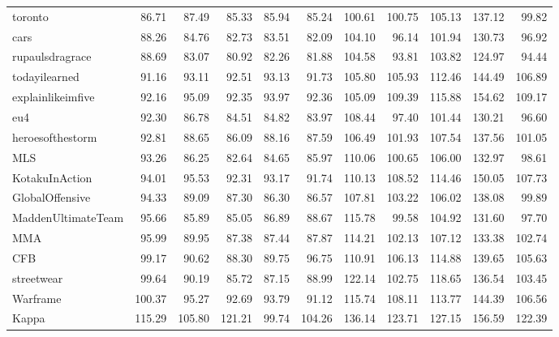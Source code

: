 \begin{tabular}{lrrrrrrrrrr}
toronto             &  86.71 &  87.49 &  85.33 & 85.94 &  85.24 &      100.61 & 100.75 & 105.13 & 137.12 &  99.82 \\
cars                &  88.26 &  84.76 &  82.73 & 83.51 &  82.09 &      104.10 &  96.14 & 101.94 & 130.73 &  96.92 \\
rupaulsdragrace     &  88.69 &  83.07 &  80.92 & 82.26 &  81.88 &      104.58 &  93.81 & 103.82 & 124.97 &  94.44 \\
todayilearned       &  91.16 &  93.11 &  92.51 & 93.13 &  91.73 &      105.80 & 105.93 & 112.46 & 144.49 & 106.89 \\
explainlikeimfive   &  92.16 &  95.09 &  92.35 & 93.97 &  92.36 &      105.09 & 109.39 & 115.88 & 154.62 & 109.17 \\
eu4                 &  92.30 &  86.78 &  84.51 & 84.82 &  83.97 &      108.44 &  97.40 & 101.44 & 130.21 &  96.60 \\
heroesofthestorm    &  92.81 &  88.65 &  86.09 & 88.16 &  87.59 &      106.49 & 101.93 & 107.54 & 137.56 & 101.05 \\
MLS                 &  93.26 &  86.25 &  82.64 & 84.65 &  85.97 &      110.06 & 100.65 & 106.00 & 132.97 &  98.61 \\
KotakuInAction      &  94.01 &  95.53 &  92.31 & 93.17 &  91.74 &      110.13 & 108.52 & 114.46 & 150.05 & 107.73 \\
GlobalOffensive     &  94.33 &  89.09 &  87.30 & 86.30 &  86.57 &      107.81 & 103.22 & 106.02 & 138.08 &  99.89 \\
MaddenUltimateTeam  &  95.66 &  85.89 &  85.05 & 86.89 &  88.67 &      115.78 &  99.58 & 104.92 & 131.60 &  97.70 \\
MMA                 &  95.99 &  89.95 &  87.38 & 87.44 &  87.87 &      114.21 & 102.13 & 107.12 & 133.38 & 102.74 \\
CFB                 &  99.17 &  90.62 &  88.30 & 89.75 &  96.75 &      110.91 & 106.13 & 114.88 & 139.65 & 105.63 \\
streetwear          &  99.64 &  90.19 &  85.72 & 87.15 &  88.99 &      122.14 & 102.75 & 118.65 & 136.54 & 103.45 \\
Warframe            & 100.37 &  95.27 &  92.69 & 93.79 &  91.12 &      115.74 & 108.11 & 113.77 & 144.39 & 106.56 \\
Kappa               & 115.29 & 105.80 & 121.21 & 99.74 & 104.26 &      136.14 & 123.71 & 127.15 & 156.59 & 122.39 \\
\bottomrule
\end{tabular}
